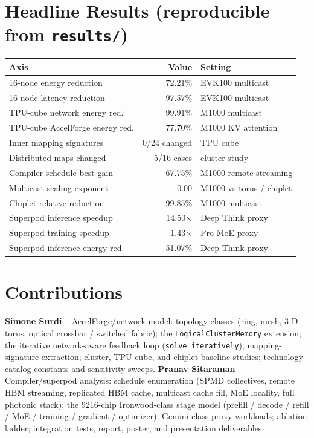 \documentclass[10pt]{article}
\begin{document}
\section*{Headline Results (reproducible from \texttt{results/})}
\begin{tabularx}{\linewidth}{@{}lrX@{}}
\toprule
Axis & Value & Setting \\
\midrule
16-node energy reduction        & 72.21\%       & EVK100 multicast \\
16-node latency reduction       & 97.57\%       & EVK100 multicast \\
TPU-cube network energy red.    & 99.91\%       & M1000 multicast \\
TPU-cube AccelForge energy red. & 77.70\%       & M1000 KV attention \\
Inner mapping signatures        & 0/24 changed  & TPU cube \\
Distributed maps changed        & 5/16 cases    & cluster study \\
Compiler-schedule best gain     & 67.75\%       & M1000 remote streaming \\
Multicast scaling exponent      & 0.00          & M1000 vs torus / chiplet \\
Chiplet-relative reduction      & 99.85\%       & M1000 multicast \\
Superpod inference speedup      & 14.50$\times$ & Deep Think proxy \\
Superpod training speedup       & 1.43$\times$  & Pro MoE proxy \\
Superpod inference energy red.  & 51.07\%       & Deep Think proxy \\
\bottomrule
\end{tabularx}

\section*{Contributions}
\textbf{Simone Surdi} -- AccelForge/network model: topology classes
(ring, mesh, 3-D torus, optical crossbar / switched fabric); the
\texttt{LogicalClusterMemory} extension; the iterative network-aware
feedback loop (\texttt{solve\_iteratively}); mapping-signature
extraction; cluster, TPU-cube, and chiplet-baseline studies;
technology-catalog constants and sensitivity sweeps.
\quad
\textbf{Pranav Sitaraman} -- Compiler/superpod analysis: schedule
enumeration (SPMD collectives, remote HBM streaming, replicated HBM
cache, multicast cache fill, MoE locality, full photonic stack);
the 9216-chip Ironwood-class stage model (prefill / decode / refill /
MoE / training / gradient / optimizer); Gemini-class proxy workloads;
ablation ladder; integration tests; report, poster, and presentation
deliverables.
\end{document}
